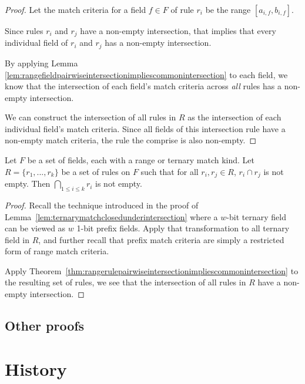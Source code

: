 \documentclass[acmsmall]{acmart}
\begin{document}
\begin{proof}
Let the match criteria for a field $f \in F$ of rule $r_i$ be
the range $[a_{i,f}, b_{i,f}]$.

Since rules $r_i$ and $r_j$ have a non-empty intersection,
that implies that every individual field of $r_i$ and $r_j$
has a non-empty intersection.

By applying Lemma~
\ref{lem:rangefieldpairwiseintersectionimpliescommonintersection}
to each field, we know that the intersection of each field's
match criteria across {\em all} rules has a non-empty intersection.

We can construct the intersection of all rules in $R$ as
the intersection of each individual field's match criteria.
Since all fields of this intersection rule have a non-empty
match criteria, the rule the comprise is also non-empty.
\end{proof}


\begin{theorem}
\label{thm:ternaryrulepairwiseintersectionimpliescommonintersection}
Let $F$ be a set of fields, each with a range or ternary match kind.
Let $R = \{r_1, ..., r_k\}$ be a set of rules on $F$
such that for all $r_i, r_j \in R$, $r_i \cap r_j$ is not empty.
Then $\bigcap_{1 \leq i \leq k} r_i$ is not empty.
\end{theorem}

\begin{proof}
Recall the technique introduced in the proof of
Lemma~\ref{lem:ternarymatchclosedunderintersection}
where a $w$-bit ternary field can be viewed as
$w$ 1-bit prefix fields.
Apply that transformation to all ternary field in $R$,
and further recall that prefix match criteria are simply a restricted
form of range match criteria.

Apply Theorem~\ref{thm:rangerulepairwiseintersectionimpliescommonintersection}
to the resulting set of rules,
we see that the intersection of all rules in $R$
have a non-empty intersection.
\end{proof}

\begin{theorem}
\label{thm:addnewfilterpreservesclosedunderintersection}
\end{theorem}


\subsection{Other proofs}


\section{History}
\end{document}
